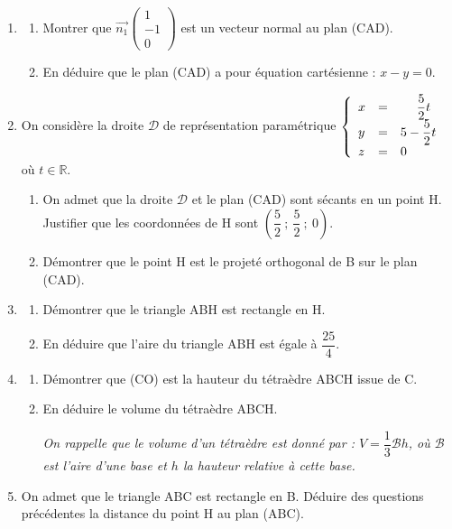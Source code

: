 \documentclass[10pt]{article}
\providecommand{\R}{\mathbb{R}}
\providecommand{\vect}[1]{\overrightarrow{#1}}
\begin{document}
\begin{enumerate}
	\item \begin{enumerate}
		\item Montrer que $\vect{n_{1}}\begin{pmatrix}1 \\ -1 \\ 0\end{pmatrix}$ est un vecteur normal au plan (CAD).

		\item En déduire que le plan (CAD) a pour équation cartésienne : \quad $x-y=0$.
	\end{enumerate}

	\item On considère la droite $\mathcal{D}$ de représentation paramétrique \renewcommand\arraystretch{1.8}$\left\{\begin{array}{l c l}x&=&\phantom{5 -}\dfrac{5}{2} t \\ y&=&5-\dfrac{5}{2} t \\ z&=&0\end{array}\right.$ où $t \in \R$.\renewcommand\arraystretch{1}


	\begin{enumerate}
		\item On admet que la droite $\mathcal{D}$ et le plan (CAD) sont sécants en un point H. Justifier que les coordonnées de H sont $\left(\dfrac{5}{2}~;~\dfrac{5}{2}~;~0\right)$.

		\item Démontrer que le point H est le projeté orthogonal de B sur le plan (CAD).
	\end{enumerate}

	\item \begin{enumerate}
		\item Démontrer que le triangle ABH est rectangle en H.

		\item En déduire que l'aire du triangle ABH est égale à $\dfrac{25}{4}$.
	\end{enumerate}

	\item \begin{enumerate}
		\item Démontrer que (CO) est la hauteur du tétraèdre ABCH issue de C.

		\item En déduire le volume du tétraèdre ABCH.

		\emph{On rappelle que le volume d'un tétraèdre est donné par : $V=\dfrac{1}{3} \mathcal{B }h$, où $\mathcal{B}$ est l'aire d'une base et $h$ la hauteur relative à cette base.}
	\end{enumerate}

	\item On admet que le triangle ABC est rectangle en B. Déduire des questions précédentes la distance du point H au plan (ABC).
\end{enumerate}

\medskip
\end{document}
